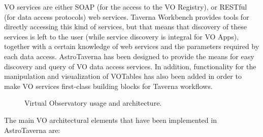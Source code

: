 \documentclass[final,authoryear,5p,times,twocolumn]{elsarticle}
\begin{document}
VO services are either SOAP (for the access to the VO Registry), or RESTful (for data access protocols) web services. Taverna Workbench provides tools for directly accessing this kind of services, but that means that discovery of these services is left to the user (while service discovery is integral for VO Apps), together with a certain knowledge of web services and the parameters required by each data access. AstroTaverna has been designed to provide the means for easy discovery and query of VO data access services. In addition, functionality for the manipulation and visualization of VOTables has also been added in order to make VO services first-class building blocks for Taverna workflows.

\begin{figure}[tb]
\centering
{} 
\caption{Virtual Observatory usage and architecture.}
\label{fig:VOArch}
\end{figure}

The main VO architectural elements that have been implemented in AstroTaverna are:
\end{document}
